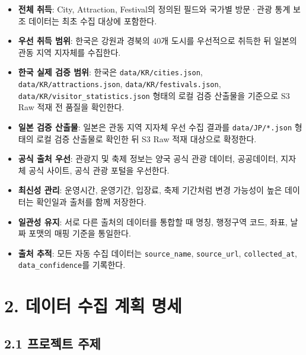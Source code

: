 \documentclass[12pt,a4paper]{article}
\newcommand{\DocNeedspace}[1]{\par\ifdim\dimexpr\pagegoal-\pagetotal\relax<#1\newpage\fi}
\begin{document}
\begin{itemize}
\item \textbf{전체 취득}: City, Attraction, Festival의 정의된 필드와 국가별 방문·관광 통계 보조 데이터는 최초 수집 대상에 포함한다.
\item \textbf{우선 취득 범위}: 한국은 강원과 경북의 40개 도시를 우선적으로 취득한 뒤 일본의 관동 지역 지자체를 수집한다.
\item \textbf{한국 실제 검증 범위}: 한국은 \texttt{data/\allowbreak{}KR/\allowbreak{}cities.\allowbreak{}json}, \texttt{data/\allowbreak{}KR/\allowbreak{}attractions.\allowbreak{}json}, \texttt{data/\allowbreak{}KR/\allowbreak{}festivals.\allowbreak{}json}, \texttt{data/\allowbreak{}KR/\allowbreak{}visitor\_\allowbreak{}statistics.\allowbreak{}json} 형태의 로컬 검증 산출물을 기준으로 S3 Raw 적재 전 품질을 확인한다.
\item \textbf{일본 검증 산출물}: 일본은 관동 지역 지자체 우선 수집 결과를 \texttt{data/\allowbreak{}JP/\allowbreak{}*.\allowbreak{}json} 형태의 로컬 검증 산출물로 확인한 뒤 S3 Raw 적재 대상으로 확정한다.
\item \textbf{공식 출처 우선}: 관광지 및 축제 정보는 양국 공식 관광 데이터, 공공데이터, 지자체 공식 사이트, 공식 관광 포털을 우선한다.
\item \textbf{최신성 관리}: 운영시간, 운영기간, 입장료, 축제 기간처럼 변경 가능성이 높은 데이터는 확인일과 출처를 함께 저장한다.
\item \textbf{일관성 유지}: 서로 다른 출처의 데이터를 통합할 때 명칭, 행정구역 코드, 좌표, 날짜 포맷의 매핑 기준을 통일한다.
\item \textbf{출처 추적}: 모든 자동 수집 데이터는 \texttt{source\_\allowbreak{}name}, \texttt{source\_\allowbreak{}url}, \texttt{collected\_\allowbreak{}at}, \texttt{data\_\allowbreak{}confidence}를 기록한다.
\end{itemize}


\newpage

\DocNeedspace{10\baselineskip}
\section*{2. 데이터 수집 계획 명세}


\DocNeedspace{8\baselineskip}
\subsection*{2.1 프로젝트 주제}
\end{document}

